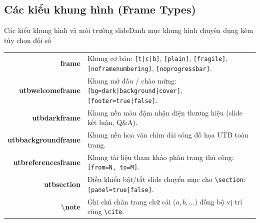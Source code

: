 \documentclass[aspectratio=43,10pt]{beamer}
\begin{document}
\subsection{Các kiểu khung hình (Frame Types)}
\begin{frame}{Các kiểu khung hình và môi trường slide}{Danh mục khung hình chuyên dụng kèm tùy chọn đối số}
  \scriptsize
  \centering
  \begin{tabularx}{\textwidth}{>{\ttfamily\bfseries\color{utbmain}}r >{\small}X}
    frame               & Khung cơ bản: \texttt{[t|c|b]}, \texttt{[plain]}, \texttt{[fragile]}, \texttt{[noframenumbering]}, \texttt{[noprogressbar]}. \\
    utbwelcomeframe    & Khung mở đầu / chào mừng: \texttt{[bg=dark|background|cover]}, \texttt{[footer=true|false]}. \\
    utbdarkframe       & Khung nền màu đậm nhận diện thương hiệu (slide kết luận, Q\&A). \\
    utbbackgroundframe & Khung nền hoa văn chìm dải sóng đồ họa UTB toàn trang. \\
    utbreferencesframe & Khung tài liệu tham khảo phân trang thủ công: \texttt{[from=N, to=M]}. \\
    utbsection         & Điều khiển bật/tắt slide chuyển mục cho \texttt{\textbackslash section}: \texttt{[panel=true|false]}. \\
    \textbackslash note & Ghi chú chân trang chữ cái ($a, b, \dots$) đồng bộ vị trí cùng \texttt{\textbackslash cite}. \\
  \end{tabularx}
\end{frame}
\end{document}
